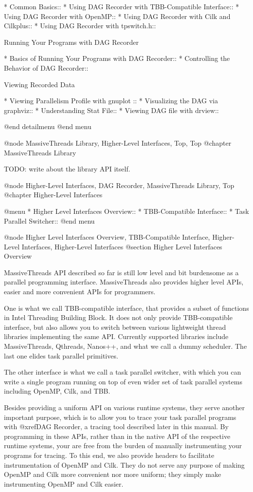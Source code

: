 * Common Basics::
* Using DAG Recorder with TBB-Compatible Interface::
* Using DAG Recorder with OpenMP::
* Using DAG Recorder with Cilk and Cilkplus::
* Using DAG Recorder with tpswitch.h::

Running Your Programs with DAG Recorder

* Basics of Running Your Programs with DAG Recorder::
* Controlling the Behavior of DAG Recorder::

Viewing Recorded Data

* Viewing Parallelism Profile with gnuplot ::
* Visualizing the DAG via graphviz::
* Understanding Stat File::
* Viewing DAG file with drview::

@end detailmenu
@end menu

@node MassiveThreads Library, Higher-Level Interfaces, Top, Top
@chapter MassiveThreads Library

TODO: write about the library API itself.

@node Higher-Level Interfaces, DAG Recorder, MassiveThreads Library, Top
@chapter Higher-Level Interfaces

@menu
* Higher Level Interfaces Overview::
* TBB-Compatible Interface::
* Task Parallel Switcher::
@end menu

@node Higher Level Interfaces Overview, TBB-Compatible Interface, Higher-Level Interfaces, Higher-Level Interfaces
@section Higher Level Interfaces Overview

MassiveThreads API described so far is still low level and bit
burdensome as a parallel programming interface.  MassiveThreads also
provides higher level APIs, easier and more convenient APIs for
programmers.

One is what we call TBB-compatible interface, that provides a subset of
functions in Intel Threading Building Block.  It does not only provide
TBB-compatible interface, but also allows you to switch between various
lightweight thread libraries implementing the same API.  Currently
supported libraries include MassiveThreads, Qthreads, Nanos++, and what
we call a dummy scheduler.  The last one elides task parallel primitives.

The other interface is what we call a task parallel switcher, with which
you can write a single program running on top of even wider set of task
parallel systems including OpenMP, Cilk, and TBB.  

Besides providing a uniform API on various runtime systems, they serve
another important purpose, which is to allow you to trace your task
parallel programs with @xref{DAG Recorder}, a tracing tool described
later in this manual.  By programming in these APIs, rather than in the
native API of the respective runtime systems, your are free from the
burden of manually instrumenting your programs for tracing.  To this
end, we also provide headers to facilitate instrumentation of OpenMP and
Cilk.  They do not serve any purpose of making OpenMP and Cilk more
convenient nor more uniform; they simply make instrumenting OpenMP and
Cilk easier.


